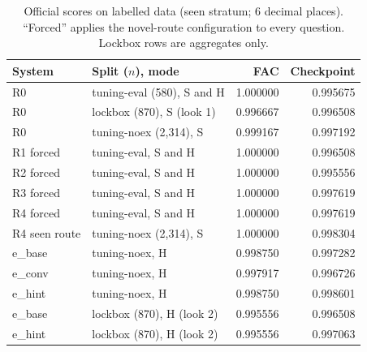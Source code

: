 \begin{table}[t]
\caption{Official scores on labelled data (seen stratum; 6 decimal places). ``Forced'' applies the novel-route configuration to every question. Lockbox rows are aggregates only.}
\label{tab:labelled}
\centering
\scriptsize
\begin{tabular}{@{}llrr@{}}
\toprule
System & Split ($n$), mode & FAC & Checkpoint \\
\midrule
R0 & tuning-eval (580), S and H & 1.000000 & 0.995675 \\
R0 & lockbox (870), S (look 1) & 0.996667 & 0.996508 \\
R0 & tuning-noex (2,314), S & 0.999167 & 0.997192 \\
R1 forced & tuning-eval, S and H & 1.000000 & 0.996508 \\
R2 forced & tuning-eval, S and H & 1.000000 & 0.995556 \\
R3 forced & tuning-eval, S and H & 1.000000 & 0.997619 \\
R4 forced & tuning-eval, S and H & 1.000000 & 0.997619 \\
R4 seen route & tuning-noex (2,314), S & 1.000000 & 0.998304 \\
\midrule
e\_base & tuning-noex, H & 0.998750 & 0.997282 \\
e\_conv & tuning-noex, H & 0.997917 & 0.996726 \\
e\_hint & tuning-noex, H & 0.998750 & 0.998601 \\
e\_base & lockbox (870), H (look 2) & 0.995556 & 0.996508 \\
e\_hint & lockbox (870), H (look 2) & 0.995556 & 0.997063 \\
\bottomrule
\end{tabular}
\end{table}
